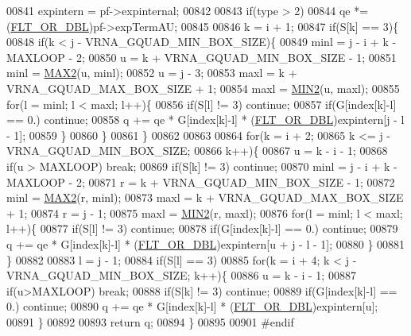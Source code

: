 \begin{DoxyCode}
00841   expintern = pf->expinternal;
00842 
00843   \textcolor{keywordflow}{if}(type > 2)
00844     qe *= (\hyperlink{group__data__structures_ga31125aeace516926bf7f251f759b6126}{FLT\_OR\_DBL})pf->expTermAU;
00845 
00846   k = i + 1;
00847   \textcolor{keywordflow}{if}(S[k] == 3)\{
00848     \textcolor{keywordflow}{if}(k < j - VRNA\_GQUAD\_MIN\_BOX\_SIZE)\{
00849       minl  = j - i + k - MAXLOOP - 2;
00850       u     = k + VRNA\_GQUAD\_MIN\_BOX\_SIZE - 1;
00851       minl  = \hyperlink{group__utils_ga33297b3679c713b0c4d897cd0fe3b122}{MAX2}(u, minl);
00852       u     = j - 3;
00853       maxl  = k + VRNA\_GQUAD\_MAX\_BOX\_SIZE + 1;
00854       maxl  = \hyperlink{group__utils_gae0b9cd0ce090bd69b951aa73e8fa4f7d}{MIN2}(u, maxl);
00855       \textcolor{keywordflow}{for}(l = minl; l < maxl; l++)\{
00856         \textcolor{keywordflow}{if}(S[l] != 3) \textcolor{keywordflow}{continue};
00857         \textcolor{keywordflow}{if}(G[index[k]-l] == 0.) \textcolor{keywordflow}{continue};
00858         q += qe * G[index[k]-l] * (\hyperlink{group__data__structures_ga31125aeace516926bf7f251f759b6126}{FLT\_OR\_DBL})expintern[j - l - 1];
00859       \}
00860     \}
00861   \}
00862 
00863 
00864   \textcolor{keywordflow}{for}(k = i + 2;
00865       k <= j - VRNA\_GQUAD\_MIN\_BOX\_SIZE;
00866       k++)\{
00867     u = k - i - 1;
00868     \textcolor{keywordflow}{if}(u > MAXLOOP) \textcolor{keywordflow}{break};
00869     \textcolor{keywordflow}{if}(S[k] != 3) \textcolor{keywordflow}{continue};
00870     minl  = j - i + k - MAXLOOP - 2;
00871     r     = k + VRNA\_GQUAD\_MIN\_BOX\_SIZE - 1;
00872     minl  = \hyperlink{group__utils_ga33297b3679c713b0c4d897cd0fe3b122}{MAX2}(r, minl);
00873     maxl  = k + VRNA\_GQUAD\_MAX\_BOX\_SIZE + 1;
00874     r     = j - 1;
00875     maxl  = \hyperlink{group__utils_gae0b9cd0ce090bd69b951aa73e8fa4f7d}{MIN2}(r, maxl);
00876     \textcolor{keywordflow}{for}(l = minl; l < maxl; l++)\{
00877       \textcolor{keywordflow}{if}(S[l] != 3) \textcolor{keywordflow}{continue};
00878       \textcolor{keywordflow}{if}(G[index[k]-l] == 0.) \textcolor{keywordflow}{continue};
00879       q += qe * G[index[k]-l] * (\hyperlink{group__data__structures_ga31125aeace516926bf7f251f759b6126}{FLT\_OR\_DBL})expintern[u + j - l - 1];
00880     \}
00881   \}
00882 
00883   l = j - 1;
00884   \textcolor{keywordflow}{if}(S[l] == 3)
00885     \textcolor{keywordflow}{for}(k = i + 4; k < j - VRNA\_GQUAD\_MIN\_BOX\_SIZE; k++)\{
00886       u    = k - i - 1;
00887       \textcolor{keywordflow}{if}(u>MAXLOOP) \textcolor{keywordflow}{break};
00888       \textcolor{keywordflow}{if}(S[k] != 3) \textcolor{keywordflow}{continue};
00889       \textcolor{keywordflow}{if}(G[index[k]-l] == 0.) \textcolor{keywordflow}{continue};
00890       q += qe * G[index[k]-l] * (\hyperlink{group__data__structures_ga31125aeace516926bf7f251f759b6126}{FLT\_OR\_DBL})expintern[u];
00891     \}
00892 
00893   \textcolor{keywordflow}{return} q;
00894 \}
00895 
00901 \textcolor{preprocessor}{#endif}
\end{DoxyCode}
